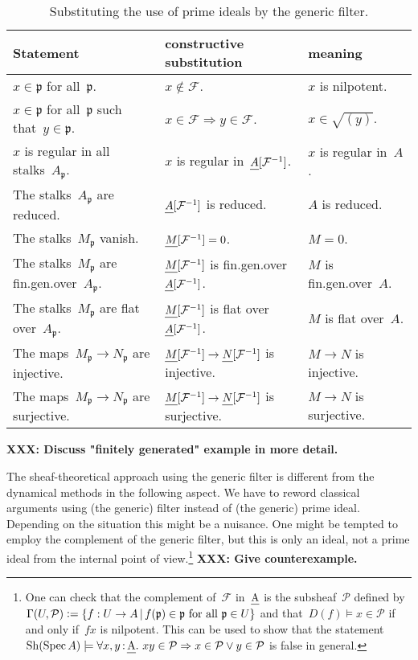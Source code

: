 \documentclass[10pt,reqno,a4paper]{amsbook}
\theoremstyle{definition}
\theoremstyle{plain}
\theoremstyle{remark}
\newcommand{\F}{\mathcal{F}}
\renewcommand{\P}{\mathcal{P}}
\newcommand{\ppp}{\mathfrak{p}}
\let\oldul\ul
\renewcommand{\ul}[1]{\text{\oldul{$#1$}}}
\newcommand{\Sh}{\mathrm{Sh}}
\DeclareMathOperator{\Spec}{Spec}
\newcommand{\?}{\,{:}\,}
\renewcommand{\_}{\mathpunct{.}\,}
\newcommand{\XXX}[1]{\textbf{XXX: #1}}
\newcommand{\defeq}{\vcentcolon=}
\begin{document}
\begin{table}
  \centering
  \renewcommand{\arraystretch}{1.3}
  \small
  \begin{tabular}{lll}
    \toprule
    Statement & constructive substitution & meaning \\\midrule
    $x \in \ppp$ for all~$\ppp$. &
    $x \not\in \F$. &
    $x$ is nilpotent. \\
    $x \in \ppp$ for all~$\ppp$ such that~$y \in \ppp$. &
    $x \in \F \Rightarrow y \in \F$. &
    $x \in \sqrt{(y)}$. \\
    $x$ is regular in all stalks~$A_\ppp$. &
    $x$ is regular in~$\ul{A}[\F^{-1}]$. &
    $x$ is regular in~$A$. \\
    The stalks~$A_\ppp$ are reduced. &
    $\ul{A}[\F^{-1}]$ is reduced. &
    $A$ is reduced. \\
    The stalks~$M_\ppp$ vanish. &
    $\ul{M}[\F^{-1}] = 0$. &
    $M = 0$. \\
    The stalks~$M_\ppp$ are fin.\@ gen.\@ over~$A_\ppp$. &
    $\ul{M}[\F^{-1}]$ is fin.\@ gen.\@ over
    $\ul{A}[\F^{-1}]$. &
    $M$ is fin.\@ gen.\@ over~$A$. \\
    The stalks~$M_\ppp$ are flat over~$A_\ppp$. &
    $\ul{M}[\F^{-1}]$ is flat over~$\ul{A}[\F^{-1}]$. &
    $M$ is flat over~$A$. \\
    The maps~$M_\ppp \to N_\ppp$ are injective. &
    $\ul{M}[\F^{-1}] \to \ul{N}[\F^{-1}]$ is injective. &
    $M \to N$ is injective. \\
    The maps~$M_\ppp \to N_\ppp$ are surjective. &
    $\ul{M}[\F^{-1}] \to \ul{N}[\F^{-1}]$ is surjective. &
    $M \to N$ is surjective. \\
    \bottomrule
  \end{tabular}
  \vspace{0.5em}

  \caption{\label{table:generic-filter-statements}Substituting the use of prime
  ideals by the generic filter.}
\end{table}
\XXX{Discuss "finitely generated" example in more detail.}

The sheaf-theoretical approach using the generic filter is different from the
dynamical methods in the following aspect. We have to reword classical
arguments using (the generic) filter instead of (the generic) prime ideal.
Depending on the situation this might be a nuisance. One might be tempted to
employ the complement of the generic filter, but this is only an ideal, not a
prime ideal from the internal point of view.\footnote{One can check that the
complement of~$\F$ in~$\ul{A}$ is the subsheaf~$\P$ defined by~$\Gamma(U, \P)
\defeq \{ f : U \to A \,|\, \text{$f(\ppp) \in \ppp$ for all~$\ppp \in U$} \}$
and that~$D(f) \models x \in \P$ if and only if~$fx$ is nilpotent. This can be
used to show that the statement~$\Sh(\Spec A) \models \forall x,y\?\ul{A}\_ xy
\in \P \Rightarrow x \in \P \vee y \in \P$ is false in general.}
\XXX{Give counterexample.}
\end{document}
